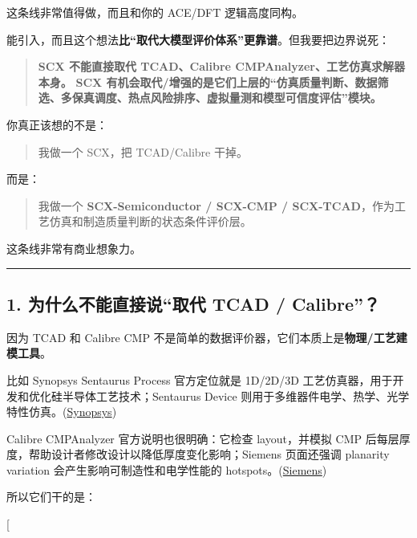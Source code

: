 \documentclass[
  12pt,
]{ctexart}
\begin{document}
这条线非常值得做，而且和你的 ACE/DFT 逻辑高度同构。

能引入，而且这个想法\textbf{比``取代大模型评价体系''更靠谱}。但我要把边界说死：

\begin{quote}
\textbf{SCX 不能直接取代 TCAD、Calibre
CMPAnalyzer、工艺仿真求解器本身。} \textbf{SCX
有机会取代/增强的是它们上层的``仿真质量判断、数据筛选、多保真调度、热点风险排序、虚拟量测和模型可信度评估''模块。}
\end{quote}

你真正该想的不是：

\begin{quote}
我做一个 SCX，把 TCAD/Calibre 干掉。
\end{quote}

而是：

\begin{quote}
我做一个 \textbf{SCX-Semiconductor / SCX-CMP /
SCX-TCAD}，作为工艺仿真和制造质量判断的状态条件评价层。
\end{quote}

这条线非常有商业想象力。

\begin{center}\rule{0.5\linewidth}{0.5pt}\end{center}

\subsection{1. 为什么不能直接说``取代 TCAD /
Calibre''？}\label{ux4e3aux4ec0ux4e48ux4e0dux80fdux76f4ux63a5ux8bf4ux53d6ux4ee3-tcad-calibre}

因为 TCAD 和 Calibre CMP
不是简单的数据评价器，它们本质上是\textbf{物理/工艺建模工具}。

比如 Synopsys Sentaurus Process 官方定位就是 1D/2D/3D
工艺仿真器，用于开发和优化硅半导体工艺技术；Sentaurus Device
则用于多维器件电学、热学、光学特性仿真。(\href{https://arxiv.org/html/2406.17557v1?utm_source=chatgpt.com}{Synopsys})

Calibre CMPAnalyzer 官方说明也很明确：它检查 layout，并模拟 CMP
后每层厚度，帮助设计者修改设计以降低厚度变化影响；Siemens 页面还强调
planarity variation 会产生影响可制造性和电学性能的
hotspots。(\href{https://arxiv.org/abs/2501.07314?utm_source=chatgpt.com}{Siemens})

所以它们干的是：

{[}  \rightarrow
{} \rightarrow
\text{thickness / IV / stress / defect / hotspot prediction}{]}
\end{document}
